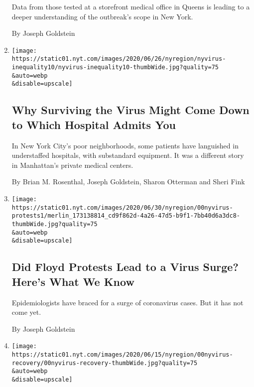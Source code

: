 \begin{enumerate}
  Data from those tested at a storefront medical office in Queens is
  leading to a deeper understanding of the outbreak's scope in New York.

  By Joseph Goldstein
\item
  \href{/2020/07/01/nyregion/Coronavirus-hospitals.html}{}

  \texttt{[image: https://static01.nyt.com/images/2020/06/26/nyregion/nyvirus-inequality10/nyvirus-inequality10-thumbWide.jpg?quality=75\\\&auto=webp\\\&disable=upscale]}

  \hypertarget{why-surviving-the-virus-might-come-down-to-which-hospital-admits-you}{%
  \subsection{Why Surviving the Virus Might Come Down to Which Hospital
  Admits
  You}\label{why-surviving-the-virus-might-come-down-to-which-hospital-admits-you}}

  In New York City's poor neighborhoods, some patients have languished
  in understaffed hospitals, with substandard equipment. It was a
  different story in Manhattan's private medical centers.

  By Brian M. Rosenthal, Joseph Goldstein, Sharon Otterman and Sheri
  Fink
\item
  \href{/2020/07/01/nyregion/nyc-coronavirus-protests.html}{}

  \texttt{[image: https://static01.nyt.com/images/2020/06/30/nyregion/00nyvirus-protests1/merlin\_173138814\_cd9f862d-4a26-47d5-b9f1-7bb40d6a3dc8-thumbWide.jpg?quality=75\\\&auto=webp\\\&disable=upscale]}

  \hypertarget{did-floyd-protests-lead-to-a-virus-surge-heres-what-we-know}{%
  \subsection{Did Floyd Protests Lead to a Virus Surge? Here's What We
  Know}\label{did-floyd-protests-lead-to-a-virus-surge-heres-what-we-know}}

  Epidemiologists have braced for a surge of coronavirus cases. But it
  has not come yet.

  By Joseph Goldstein
\item
  \href{/2020/06/17/nyregion/coronavirus-recovery-hospital.html}{}

  \texttt{[image: https://static01.nyt.com/images/2020/06/15/nyregion/00nyvirus-recovery/00nyvirus-recovery-thumbWide.jpg?quality=75\\\&auto=webp\\\&disable=upscale]}


\end{enumerate}
